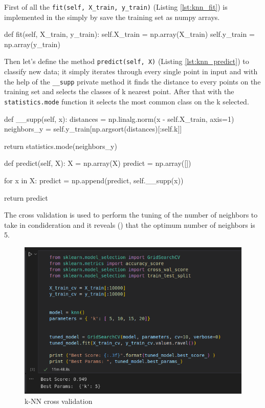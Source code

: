 \documentclass[12pt]{article}
\begin{document}
First of all the \verb|fit(self, X_train, y_train)| (Listing \ref{lst:knn_fit}) 
is implemented in the simply
by save the training set as numpy arrays.

\begin{python}[caption={k-NN fit method},label={lst:knn_fit}]
def fit(self, X_train, y_train):
    self.X_train = np.array(X_train)
    self.y_train = np.array(y_train)
\end{python}

Then let's define the method \verb|predict(self, X)| (Listing \ref{lst:knn_predict}) 
to classify new data; it simply iterates through every single point in input and 
with the help of the \verb|__supp| private method it finds the distance to every 
points on the training set and selects the classes of k nearest point. 
After that with the \verb|statistics.mode| function it selects the most common 
class on the k selected.

\begin{python}[caption={k-NN predict method},label={lst:knn_predict}]
def __supp(self, x):
    distances = np.linalg.norm(x - self.X_train, axis=1)
    neighbors_y = self.y_train[np.argsort(distances)[:self.k]]

    return statistics.mode(neighbors_y)


def predict(self, X):
    X = np.array(X)
    predict = np.array([])

    for x in X:
        predict = np.append(predict, self.__supp(x))

    return predict
\end{python}

The cross validation is used to perform the tuning of the number of neighbors to take
in condideration and it reveals () that the optimum number of neighbors is 5.

\begin{figure}[H]
    \centering
    \includegraphics[scale=0.6]{knn_cross.png}
    \caption{k-NN cross validation}
    \label{fig:knn_cross}
\end{figure}
\end{document}
